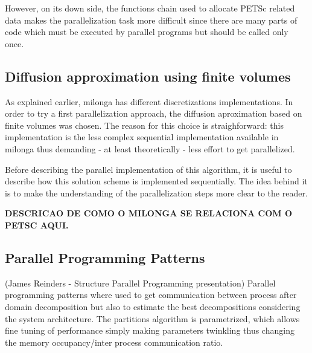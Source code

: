 \documentclass{anstrans}
\begin{document}
However, on its down side, the functions chain used to allocate PETSc related 
data makes the parallelization task more difficult since there are many parts 
of code which must be executed by parallel programs but should be called only 
once.

\subsection{Diffusion approximation using finite volumes}

As explained earlier, milonga has different discretizations implementations. 
In order to try a first parallelization approach, the diffusion aproximation 
based on finite volumes was chosen. The reason for this choice is straighforward: 
this implementation is the less complex sequential implementation available in milonga thus demanding - at least theoretically - less effort to get parallelized.

Before describing the parallel implementation of this algorithm, it is useful to 
describe how this solution scheme is implemented sequentially. The idea behind it 
is to make the understanding of the parallelization steps more clear to the reader.

\textbf{DESCRICAO DE COMO O MILONGA SE RELACIONA COM O PETSC AQUI.}

\subsection{Parallel Programming Patterns}
(James Reinders - Structure Parallel Programming presentation)
Parallel programming patterns where used to get communication between process after
domain decomposition but also to estimate the best decompositions considering the system
architecture. The partitions algorithm is parametrized, which allows fine tuning of performance
simply making parameters twinkling thus changing the memory occupancy/inter process communication ratio.
\end{document}
